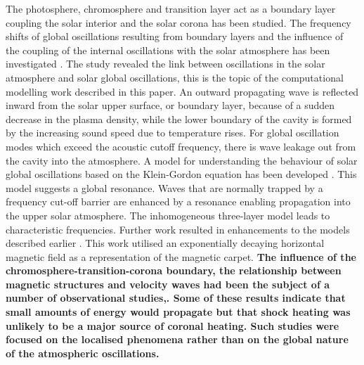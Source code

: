 \documentclass[physics,article,submit,pdftex,moreauthors]{Definitions/mdpi}
\begin{document}
 The photosphere, chromosphere and transition layer act as a boundary layer coupling the solar interior and the solar corona has been studied. The frequency shifts of global oscillations resulting  from boundary layers   and the influence of the coupling of the internal oscillations with the solar atmosphere has been investigated \cite{Erdelyi2006}.  The study revealed the link between oscillations in the solar atmosphere and solar global oscillations,  this is the topic of the computational modelling work described in this paper. An outward propagating wave is reflected inward from the solar upper surface, or boundary layer, because of a sudden decrease in the plasma density, while the lower boundary of the cavity is formed by the increasing sound speed due to temperature rises. For global oscillation modes which exceed the acoustic cutoff frequency, there is wave leakage out from the cavity into the atmosphere. A model for understanding the behaviour of solar global oscillations based on the Klein-Gordon equation has been  developed \cite{Taroyan2008}. This model suggests a global resonance. Waves  that are normally trapped by a frequency cut-off barrier are enhanced by a resonance enabling propagation into the upper solar atmosphere. The inhomogeneous three-layer model leads to characteristic frequencies. Further work resulted in enhancements to the models described earlier \cite{Pinter2007}.  This work utilised an exponentially decaying horizontal magnetic field as a representation of the magnetic carpet. {\bf The influence of the chromosphere-transition-corona boundary, the relationship between magnetic structures and velocity waves had been the subject of a number of observational studies\cite{Mein1976},\cite{Schmieder1980}. Some of these results indicate that small amounts of energy would propagate but that shock heating was unlikely to be a major source of coronal heating. Such studies were focused on the localised phenomena rather than on the global nature of the atmospheric oscillations.  }
 
\end{document}
